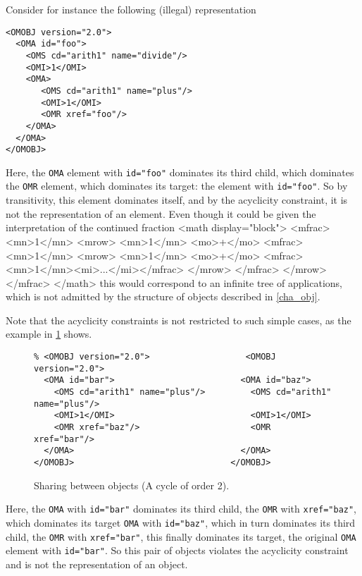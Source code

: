 Consider for instance the following (illegal) \XML representation
\begin{lstlisting}
<OMOBJ version="2.0">
  <OMA id="foo">
    <OMS cd="arith1" name="divide"/>
    <OMI>1</OMI>
    <OMA>
       <OMS cd="arith1" name="plus"/>
       <OMI>1</OMI>
       <OMR xref="foo"/>
    </OMA> 
  </OMA>
</OMOBJ>
\end{lstlisting}

Here, the \lstinline|OMA| element with
\lstinline|id="foo"| dominates its third child, which dominates the
\lstinline|OMR| element, which dominates its target: the element with
\lstinline|id="foo"|. So by transitivity, this element dominates itself, and
by the acyclicity constraint, it is not the \XML representation of an \OM
element. Even though it could be given the interpretation of the continued fraction
<math display="block">
 <mfrac>
   <mn>1</mn>
   <mrow>
     <mn>1</mn>
     <mo>+</mo>
     <mfrac>
       <mn>1</mn>
       <mrow>
         <mn>1</mn>
         <mo>+</mo>
         <mfrac><mn>1</mn><mi>...</mi></mfrac>
       </mrow>
     </mfrac>
   </mrow>
 </mfrac>
</math> this would correspond to an infinite tree of applications,
which is not admitted by the structure of \OM objects described
in \ref{cha_obj}.


Note that the acyclicity constraints is not restricted
to such simple cases, as the example in \ref{fig_sharing_between}
shows.


\begin{figure}\centering
\caption{Sharing between \OM objects (A cycle of order 2).}\label{fig_sharing_between}
\begin{lstlisting}
% <OMOBJ version="2.0">                   <OMOBJ version="2.0">
  <OMA id="bar">                         <OMA id="baz">
    <OMS cd="arith1" name="plus"/>         <OMS cd="arith1" name="plus"/>
    <OMI>1</OMI>                           <OMI>1</OMI>
    <OMR xref="baz"/>                      <OMR xref="bar"/>
  </OMA>                                 </OMA>
</OMOBJ>                               </OMOBJ>
\end{lstlisting}
\end{figure}

 Here, the \lstinline|OMA| with
\lstinline|id="bar"| dominates its third child, the
\lstinline|OMR| with \lstinline|xref="baz"|,
which dominates its target \lstinline|OMA| with
\lstinline|id="baz"|, which in turn dominates its third
child, the \lstinline|OMR| with
\lstinline|xref="bar"|, this finally dominates its
target, the original \lstinline|OMA| element with
\lstinline|id="bar"|. So this pair of \OM objects
violates the acyclicity constraint and is not the \XML
representation of an \OM object.




